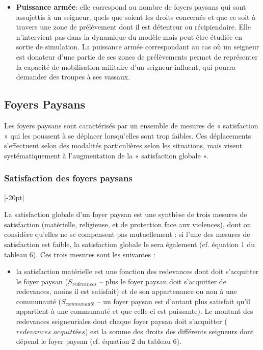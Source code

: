 {\begin{itemize}
\item \textbf{Puissance armée}: elle correspond au nombre de foyers paysans qui sont assujettis à un seigneur, quels que soient les droits concernés et que ce soit à travers une zone de prélèvement dont il est détenteur ou récipiendaire.
Elle n'intervient pas dans la dynamique du modèle mais peut être étudiée en sortie de simulation.
La puissance armée correspondant au cas où un seigneur est donateur d'une partie de ses zones de prélèvements permet de représenter la capacité de mobilisation militaire d'un seigneur influent, qui pourra demander des troupes à ses vassaux.
\end{itemize}

\subsection{Foyers Paysans}

Les foyers paysans sont caractérisés par un ensemble de mesures de « satisfaction » qui les poussent à se déplacer lorsqu'elles sont trop faibles.
Ces déplacements s'effectuent selon des modalités particulières selon les situations, mais visent systématiquement à l'augmentation de la « satisfaction globale ».

\subsubsection{Satisfaction des foyers paysans}[-20pt]

La satisfaction globale d'un foyer paysan est une synthèse de trois mesures de satisfaction (matérielle, religieuse, et de protection face aux violences), dont on considère qu'elles ne se compensent pas mutuellement :
si l'une des mesures de satisfaction est faible, la satisfaction globale le sera également (cf. équation 1 du tableau 6).
Ces trois mesures sont les suivantes :
\begin{itemize}
	\item la satisfaction matérielle est une fonction des redevances dont doit s'acquitter le foyer paysan ($S_{redevances}$ – plus le foyer paysan doit s'acquitter de redevances, moins il est satisfait) et de son appartenance ou non à une communauté ($S_{communauté}$ – un foyer paysan est d'autant plus satisfait qu'il appartient à une communauté et que celle-ci est puissante).
	Le montant des redevances seigneuriales dont chaque foyer paysan doit s'acquitter ($redevances\_acquittées$) est la somme des droits des différents seigneurs dont dépend le foyer paysan (cf. équation 2 du tableau 6).
	

\end{itemize}}
